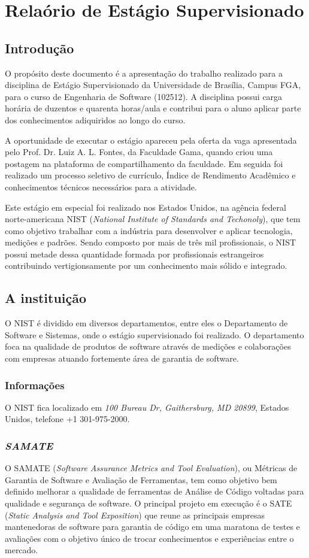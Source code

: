 \part{Relaório de Estágio Supervisionado}
\chapter{Introdução}
O propósito deste documento é a apresentação do trabalho realizado para a disciplina de Estágio Supervisionado da Universidade de Brasília, Campus FGA, para o curso de Engenharia de Software (102512). A disciplina possui carga horária de duzentos e quarenta horas/aula e contribui para o aluno aplicar parte dos conhecimentos adiquiridos ao longo do curso.

A oportunidade de executar o estágio apareceu pela oferta da vaga apresentada pelo Prof. Dr. Luiz A. L. Fontes, da Faculdade Gama, quando criou uma postagem na plataforma de compartilhamento da faculdade. Em seguida foi realizado um processo seletivo de currículo, Índice de Rendimento Acadêmico e conhecimentos técnicos necessários para a atividade.

Este estágio em especial foi realizado nos Estados Unidos, na agência federal norte-americana NIST (\textit{National Institute of Standards and Techonoly}), que tem como objetivo trabalhar com a indústria para desenvolver e aplicar tecnologia, medições e padrões. Sendo composto por mais de três mil profissionais, o NIST possui metade dessa quantidade formada por profissionais estrangeiros contribuindo vertigionsamente por um conhecimento mais sólido e integrado.


\chapter{A instituição}
O NIST é dividido em diversos departamentos, entre eles o Departamento de Software e Sistemas, onde o estágio supervisionado foi realizado. O departamento foca na qualidade de produtos de software através de medições e colaborações com empresas atuando fortemente área de garantia de software. 

\section{Informações}
O NIST fica localizado em \textit{100 Bureau Dr, Gaithersburg, MD 20899}, Estados Unidos, telefone +1 301-975-2000.

\section{\textit{SAMATE}}
O SAMATE (\textit{Software Assurance Metrics and Tool Evaluation}), ou Métricas de Garantia de Software e Avaliação de Ferramentas, tem como objetivo bem definido melhorar a qualidade de ferramentas de Análise de Código voltadas para qualidade e segurança de software. O principal projeto em execução é o SATE (\textit{Static Analysis and Tool Exposition}) que reune as principais empresas mantenedoras de software para garantia de código em uma maratona de testes e avaliações com o objetivo único de trocar conhecimentos e experiências entre o mercado.



